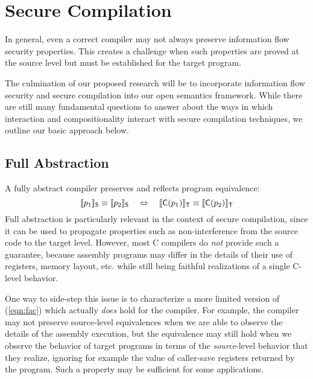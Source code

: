 \section{Secure Compilation}
\label{sec:security}

In general,
even a correct compiler may not always preserve
information flow security properties.
This creates a challenge when such properties
are proved at the source level
but must be established for the target program.

The culmination of our proposed research will be to incorporate
information flow security and secure compilation
into our open semantics framework.
While there are still many fundamental questions to answer
about the ways in which interaction and compositionality
interact with secure compilation techniques,
we outline our basic approach below.

\subsection{Full Abstraction}

A fully abstract compiler preserves and reflects program equivalence:
\begin{equation} \label{eqn:fac}
  \llbracket p_1 \rrbracket_{ \mathsf{S} } \equiv
  \llbracket p_2 \rrbracket_{ \mathsf{S} }
  \quad \Leftrightarrow \quad
  \llbracket  \mathsf{C} (p_1) \rrbracket_{ \mathsf{T} } \equiv
  \llbracket  \mathsf{C} (p_2) \rrbracket_{ \mathsf{T} }
\end{equation}
Full abstraction is particularly relevant
in the context of secure compilation,
since it can be used to propagate properties such as non-interference
from the source code to the target level.
However,
most C compilers do \emph{not} provide such a guarantee,
because assembly programs may differ in the details
of their use of registers, memory layout, etc.
while still being faithful realizations of a single C-level behavior.

One way to side-step this issue
is to characterize a more limited version of (\ref{eqn:fac})
which actually \emph{does} hold for the compiler.
For example,
the compiler may not preserve source-level equivalences
when we are able to observe the details of the assembly execution,
but the equivalence may still hold when
we observe the behavior of target programs
in terms of the \emph{source}-level behavior that they realize,
ignoring for example the value of caller-save registers
returned by the program.
Such a property may be sufficient for some applications.

